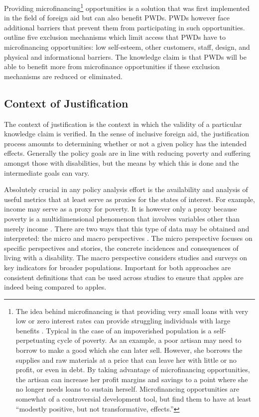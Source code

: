 \documentclass[a4paper]{article}
\begin{document}
Providing microfinancing\footnote{ The idea behind microfinancing is that
    providing very small loans with very low or zero interest rates can
    provide struggling individuals with large benefits
    \citep{wendt2006building}. Typical in the case of an impoverished
    population is a self-perpetuating cycle of poverty. As an example, a poor
    artisan may need to borrow to make a good which she can later sell.
    However, she borrows the supplies and raw materials at a price that can
    leave her with little or no profit, or even in debt. By taking advantage
    of microfinancing opportunities, the artisan can increase her profit
    margins and savings to a point where she no longer needs loans to sustain
    herself. Microfinancing opportunities are somewhat of a controversial
    development tool, but \cite{banerjee2015six} find them to have at least
    ``modestly positive, but not transformative, effects.''} 
opportunities is a solution that was first implemented in the field of foreign
aid but can also benefit PWDs. PWDs however face additional barriers that
prevent them from participating in such opportunities.
\cite{mersland2008access} outline five exclusion mechanisms which limit access
that PWDs have to microfinancing opportunities: low self-esteem, other
customers, staff, design, and physical and informational barriers. The
knowledge claim is that PWDs will be able to benefit more from microfinance
opportunities if these exclusion mechanisms are reduced or eliminated.

\subsection{Context of Justification}

The context of justification is the context in which the validity of a
particular knowledge claim is verified. In the sense of inclusive foreign aid,
the justification process amounts to determining whether or not a given policy
has the intended effects. Generally the policy goals are in line with reducing
poverty and suffering amongst those with disabilities, but the means by which
this is done and the intermediate goals can vary.

Absolutely crucial in any policy analysis effort is the availability and
analysis of useful metrics that at least serve as proxies for the states of
interest. For example, income may serve as a proxy for poverty. It is however
only a proxy because poverty is a multidimensional phenomenon that involves
variables other than merely income \citep{alkire2011understandings}. There are
two ways that this type of data may be obtained and interpreted: the micro and
macro perspectives \citep{ingstad2011disability}. The micro perspective
focuses on specific perspectives and stories, the concrete incidences and
consequences of living with a disability. The macro perspective considers
studies and surveys on key indicators for broader populations. Important for
both approaches are consistent definitions that can be used across studies to
ensure that apples are indeed being compared to apples.
\end{document}
